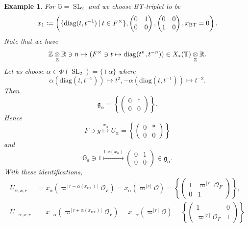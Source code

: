 \documentclass[10pt]{article}
\newtheorem{example}{Example}[section]
\numberwithin{equation}{theorem}
\DeclareMathOperator{\SL}{SL}
\newcommand{\defeq}{\vcentcolon=}
\newcommand{\bR}[0]{\mathbb{R}}
\newcommand{\Ouv}[0]{\mathcal{O}}
\newcommand{\Z}[0]{\mathbb{Z}}
\newcommand{\G}[0]{\mathbb{G}}
\newcommand{\Lie}[0]{\mathrm{Lie}}
\newcommand{\BT}[0]{\mathrm{BT}}
\newcommand{\bT}[0]{\mathbb{T}}
\newcommand{\g}[0]{\mathfrak{g}}
\newcommand{\diag}[0]{\mathrm{diag}}
\newcommand{\sep}[0]{\:|\:}
\newcommand{\tens}[1]{%
  \mathbin{\mathop{\otimes}\displaylimits_{#1}}%
}
\begin{document}
\begin{example}
    For $\G=\SL_2$ and we choose BT-triplet to be 
    \begin{equation*}
        x_1\defeq \left(\{\diag(t,t^{-1})\sep t\in F^\times\}, \begin{pmatrix}
            0 & 1 \\ 0 & 0
        \end{pmatrix},\begin{pmatrix}
            0 & 0 \\ 1 & 0
        \end{pmatrix}, x_{\mathrm{BT}}=0\right).
    \end{equation*}
    Note that we have 
    \begin{equation*}
        \Z\tens{\Z}\bR\ni n\mapsto (F^\times\ni t\mapsto \diag(t^n,t^{-n}))\in X_*(\bT)\tens{\Z}\bR.
    \end{equation*}
    Let us choose $\alpha\in\Phi(\SL_2)=\{\pm\alpha\}$ where 
    \begin{equation*}
        \alpha(\diag(t,t^{-1})) \mapsto t^2, -\alpha(\diag(t,t^{-1})) \mapsto t^{-2}. 
    \end{equation*}
    Then 
    \begin{equation*}
        \g_\alpha=\left\{\begin{pmatrix}
            0 & \ast\\ 0& 0
        \end{pmatrix}\right\}.
    \end{equation*}
    Hence 
    \begin{equation*}
        F\ni y \stackrel{x_\alpha}{\mapsto}U_\alpha = \left\{\begin{pmatrix}
            0 & \ast\\ 0& 0
        \end{pmatrix}\right\}
    \end{equation*}
    and 
    \begin{equation*}
        \G_a\ni 1\stackrel{\Lie(x_\alpha)}{\mapsto}\begin{pmatrix}
            0 & 1\\ 0& 0
        \end{pmatrix}\in\g_\alpha.
    \end{equation*}
    With these identifications, 
    \begin{align*}
        U_{\alpha,x,r} &= x_\alpha(\varpi^{\lceil r-\alpha(x_{\BT})\rceil}\Ouv_F) = x_\alpha(\varpi^{\lceil r\rceil}\Ouv) = \left\{\begin{pmatrix}
            1 & \varpi^{\lceil r\rceil}\Ouv_F\\ 0& 1
        \end{pmatrix}\right\},\\
        U_{-\alpha,x,r} &= x_{-\alpha}(\varpi^{\lceil r+\alpha(x_{\BT})\rceil}\Ouv_F) = x_{-\alpha}(\varpi^{\lceil r\rceil}\Ouv) = \left\{\begin{pmatrix}
            1 & 0\\ \varpi^{\lceil r\rceil}\Ouv_F& 1
        \end{pmatrix}\right\}
    \end{align*}
    \label{example_4_1}
\end{example}
\end{document}
